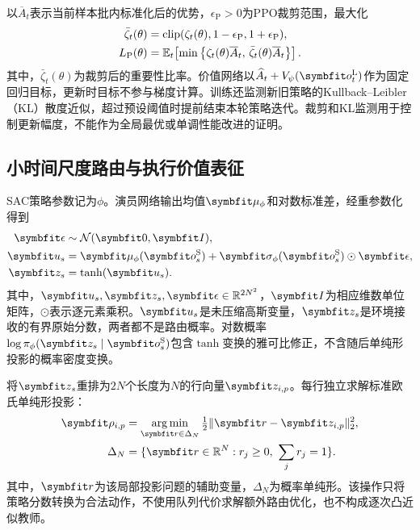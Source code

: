 以$\overline A_t$表示当前样本批内标准化后的优势，$\epsilon_{\mathrm P}>0$为PPO裁剪范围，最大化
\begin{equation}
 \begin{aligned}
 \bar\zeta_t(\theta)&=\operatorname{clip}(\zeta_t(\theta),1-\epsilon_{\mathrm P},1+\epsilon_{\mathrm P}),\\
 L_{\mathrm P}(\theta)&=
 \mathbb{E}_t\!\left[\min\left\{\zeta_t(\theta)\overline A_t,\,
 \bar\zeta_t(\theta)\overline A_t\right\}\right].
 \end{aligned}
 \label{eq:ppoobjective}
\end{equation}
其中，$\bar\zeta_t(\theta)$为裁剪后的重要性比率。价值网络以$\widehat A_t+V_\psi(\vct o_t^{\mathrm L})$作为固定回归目标，更新时目标不参与梯度计算。训练还监测新旧策略的Kullback--Leibler（KL）散度近似，超过预设阈值时提前结束本轮策略迭代。裁剪和KL监测用于控制更新幅度，不能作为全局最优或单调性能改进的证明。

\subsection{小时间尺度路由与执行价值表征}
SAC策略参数记为$\phi$。演员网络输出均值$\vct\mu_\phi$和对数标准差，经重参数化得到
\begin{equation}
 \begin{aligned}
 \vct \epsilon&\sim\mathcal N(\vct0,\mat I),\\
 \vct u_s&=\vct\mu_\phi(\vct o_s^{\mathrm S})
 +\vct\sigma_\phi(\vct o_s^{\mathrm S})\odot\vct\epsilon,\\
 \vct z_s&=\tanh(\vct u_s).
 \end{aligned}
 \label{eq:sacaction}
\end{equation}
其中，$\vct u_s,\vct z_s,\vct\epsilon\in\R^{2N^2}$，$\mat I$为相应维数单位矩阵，$\odot$表示逐元素乘积。$\vct u_s$是未压缩高斯变量，$\vct z_s$是环境接收的有界原始分数，两者都不是路由概率。对数概率$\log\pi_\phi(\vct z_s\mid\vct o_s^{\mathrm S})$包含$\tanh$变换的雅可比修正，不含随后单纯形投影的概率密度变换。

将$\vct z_s$重排为$2N$个长度为$N$的行向量$\vct z_{i,p}$。每行独立求解标准欧氏单纯形投影\cite{duchi2008}：
\begin{equation}
 \begin{aligned}
 \vct\rho_{i,p}&=
 \argmin_{\vct r\in\Delta_N}\tfrac12\|\vct r-\vct z_{i,p}\|_2^2,\\
 \Delta_N&=\{\vct r\in\R^N:r_j\ge0,\ \sum_jr_j=1\}.
 \end{aligned}
 \label{eq:simplexprojection}
\end{equation}
其中，$\vct r$为该局部投影问题的辅助变量，$\Delta_N$为概率单纯形。该操作只将策略分数转换为合法动作，不使用队列代价求解额外路由优化，也不构成逐次凸近似教师。

